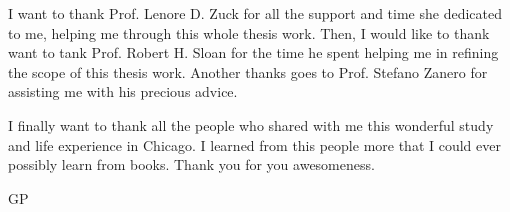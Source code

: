 
I want to thank Prof. Lenore D. Zuck for all the support and time she dedicated to me, helping me through this whole thesis work.
Then, I would like to thank want to tank Prof. Robert H. Sloan for the time he spent helping me in refining the scope of this thesis work.
Another thanks goes to Prof. Stefano Zanero for assisting me with his precious advice.

I finally want to thank all the people who shared with me this wonderful study and life experience in Chicago. I learned from this people more that I could ever possibly learn from books. Thank you for you awesomeness.

\begin{flushright}
GP
\end{flushright}
